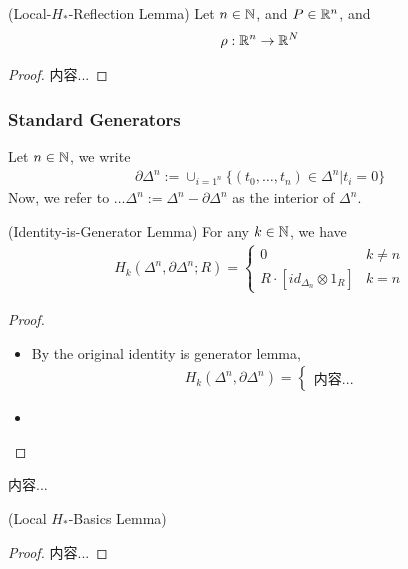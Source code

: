 \documentclass[Total.tex]{subfiles}
\begin{document}
				\begin{lemma}
					(Local-$H_*$-Reflection Lemma) Let $n\in \mathbb{N}$, and $P\in \mathbb{R}^n$, and 
					\begin{gather*}
						\rho:\mathbb{R}^n\rightarrow \mathbb{R}^N
					\end{gather*}
				\end{lemma}
				\begin{proof}
					内容...
				\end{proof}
				\subsubsection{Standard Generators} 
				\begin{Def}
					Let $n\in \mathbb{N}$, we write
					\begin{gather*}
						\partial \Delta^n:=\cup_{i=1^n} \{(t_0,\dots,t_n)\in \Delta^n|t_i=0\}
					\end{gather*}
					Now, we refer to $\dots{\Delta}^n:=\Delta^n-\partial \Delta^n$ as the interior of $\Delta^n$.
				\end{Def}
				
				\begin{lemma}
					(Identity-is-Generator Lemma) For any $k\in \mathbb{N}$, we have
					\begin{gather*}
						H_k(\Delta^n,\partial\Delta^n;R)=\begin{cases}
							0&k\not=n\\
							R\cdot [id_{\Delta_n}\otimes 1_R]&k=n
						\end{cases}
					\end{gather*}
				\end{lemma}
				\begin{proof}
					\begin{itemize}
						\item By the original identity is generator lemma,
						\begin{gather*}
							H_k(\Delta^n,\partial \Delta^n)=\begin{cases}
								内容...
							\end{cases}
						\end{gather*}
						\item 
					\end{itemize}
				\end{proof}
				
				\begin{Def}
					内容...
				\end{Def}
				
				\begin{lemma}
					(Local $H_*$-Basics Lemma)
				\end{lemma}
				\begin{proof}
					内容...
				\end{proof}
\end{document}
